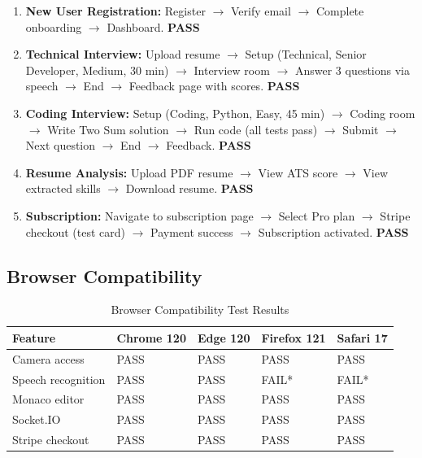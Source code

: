 \begin{enumerate}
    \item \textbf{New User Registration:}
    Register $\rightarrow$ Verify email $\rightarrow$ Complete onboarding $\rightarrow$ Dashboard. \textbf{PASS}

    \item \textbf{Technical Interview:}
    Upload resume $\rightarrow$ Setup (Technical, Senior Developer, Medium, 30 min) $\rightarrow$ Interview room $\rightarrow$ Answer 3 questions via speech $\rightarrow$ End $\rightarrow$ Feedback page with scores. \textbf{PASS}

    \item \textbf{Coding Interview:}
    Setup (Coding, Python, Easy, 45 min) $\rightarrow$ Coding room $\rightarrow$ Write Two Sum solution $\rightarrow$ Run code (all tests pass) $\rightarrow$ Submit $\rightarrow$ Next question $\rightarrow$ End $\rightarrow$ Feedback. \textbf{PASS}

    \item \textbf{Resume Analysis:}
    Upload PDF resume $\rightarrow$ View ATS score $\rightarrow$ View extracted skills $\rightarrow$ Download resume. \textbf{PASS}

    \item \textbf{Subscription:}
    Navigate to subscription page $\rightarrow$ Select Pro plan $\rightarrow$ Stripe checkout (test card) $\rightarrow$ Payment success $\rightarrow$ Subscription activated. \textbf{PASS}
\end{enumerate}

\subsection{Browser Compatibility}

\begin{table}[H]
\centering
\caption{Browser Compatibility Test Results}
\vspace{8pt}
\begin{tabularx}{\textwidth}{|X|C{2.2cm}|C{2cm}|C{2.2cm}|C{2cm}|}
\hline
\textbf{Feature} & \textbf{Chrome 120} & \textbf{Edge 120} & \textbf{Firefox 121} & \textbf{Safari 17} \\
\hline
Camera access & PASS & PASS & PASS & PASS \\
\hline
Speech recognition & PASS & PASS & FAIL* & FAIL* \\
\hline
Monaco editor & PASS & PASS & PASS & PASS \\
\hline
Socket.IO & PASS & PASS & PASS & PASS \\
\hline
Stripe checkout & PASS & PASS & PASS & PASS \\
\hline
\end{tabularx}
\label{tab:browsercompat}
\end{table}

